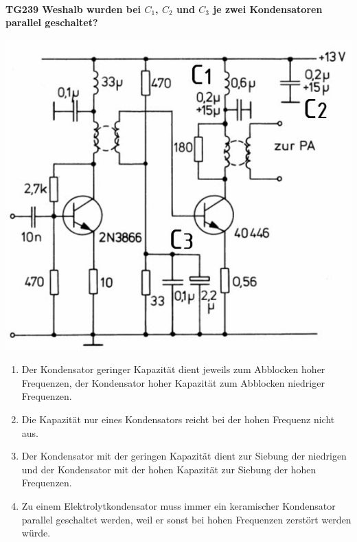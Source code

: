 \documentclass[8pt]{article}
\begin{document}
\paragraph*{TG239 Weshalb wurden bei $C_{1}$, $C_{2}$ und $C_{3}$ je zwei Kondensatoren parallel geschaltet?}
\begin{center}
	\begin{minipage}{\linewidth}
		\centering
		\includegraphics[scale=1.0]{pics/tg239_a.jpg}
	\end{minipage}
\end{center}
\begin{enumerate}[nolistsep,label=\Alph*]
\item Der Kondensator geringer Kapazität dient jeweils zum Abblocken hoher Frequenzen, der Kondensator hoher Kapazität zum Abblocken niedriger Frequenzen.
\item Die Kapazität nur eines Kondensators reicht bei der hohen Frequenz nicht aus.
\item Der Kondensator mit der geringen Kapazität dient zur Siebung der niedrigen und der Kondensator mit der hohen Kapazität zur Siebung der hohen Frequenzen.
\item Zu einem Elektrolytkondensator muss immer ein keramischer Kondensator parallel geschaltet werden, weil er sonst bei hohen Frequenzen zerstört werden würde.
\end{enumerate}
\end{document}
